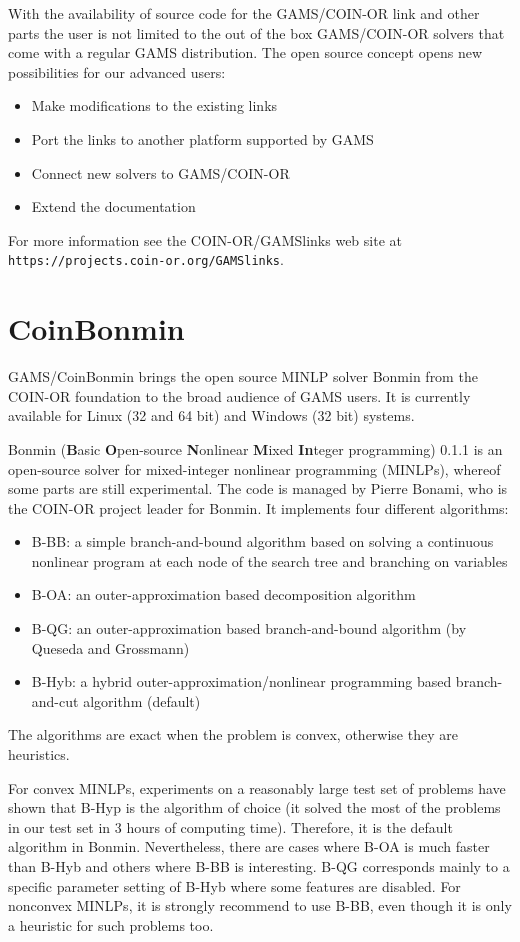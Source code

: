 With the availability of source code for the GAMS/COIN-OR link and other parts the user is not limited to the out of the box GAMS/COIN-OR solvers that come with a regular GAMS distribution.
The open source concept opens new possibilities for our advanced users:

\begin{itemize}
\item Make modifications to the existing links
\item Port the links to another platform supported by GAMS
\item Connect new solvers to GAMS/COIN-OR
\item Extend the documentation
\end{itemize}

For more information see the COIN-OR/GAMSlinks web site at
\texttt{https://projects.coin-or.org/GAMSlinks}.

\section{CoinBonmin}

GAMS/CoinBonmin brings the open source MINLP solver Bonmin from the COIN-OR foundation to the broad audience of GAMS users.
It is currently available for Linux (32 and 64 bit) and Windows (32 bit) systems.

Bonmin (\textbf{B}asic \textbf{O}pen-source \textbf{N}onlinear \textbf{M}ixed \textbf{In}teger programming) 0.1.1 is an open-source solver for mixed-integer nonlinear programming (MINLPs), whereof some parts are still experimental.
The code is managed by Pierre Bonami, who is the COIN-OR project leader for Bonmin.
It implements four different algorithms:
\begin{itemize}
\item {B-BB}: a simple branch-and-bound algorithm based on solving
a continuous nonlinear program at each node of the search tree and
branching on variables
\item {B-OA}: an outer-approximation based decomposition algorithm
\item {B-QG}: an outer-approximation based branch-and-bound algorithm (by Queseda and Grossmann)
\item {B-Hyb}: a hybrid outer-approximation/nonlinear programming based branch-and-cut algorithm (default)
\end{itemize}
The algorithms are exact when the problem is convex, otherwise they are heuristics.

For convex MINLPs, experiments on a reasonably large test set of problems have shown that B-Hyp is the algorithm of choice (it solved the most of the problems in our test set in 3 hours of computing time).
Therefore, it is the default algorithm in Bonmin.
Nevertheless, there are cases where B-OA is much faster than B-Hyb and others where B-BB is interesting.
B-QG corresponds mainly to a specific parameter setting of B-Hyb where some features are disabled.
For nonconvex MINLPs, it is strongly recommend to use B-BB, even though it is only a heuristic for such problems too.

